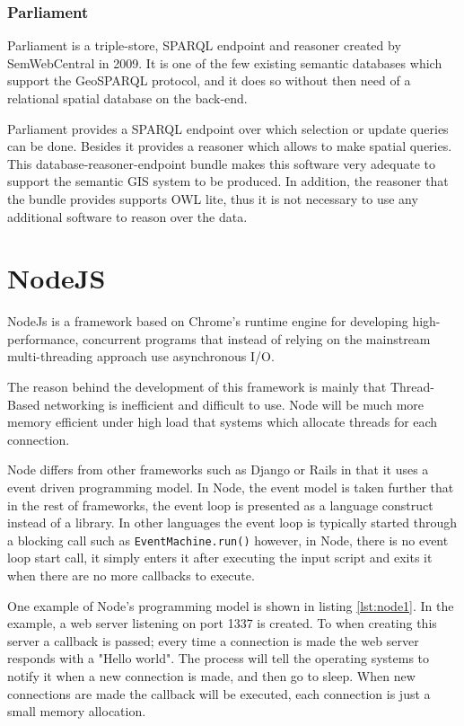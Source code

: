 \subsubsection*{Parliament}

Parliament\texttrademark\cite{parliament} is a triple-store, SPARQL endpoint and reasoner created by SemWebCentral in 2009. It is one of the few existing semantic databases which support the GeoSPARQL protocol, and it does so without then need of a relational spatial database on the back-end. 

Parliament provides a SPARQL endpoint over which selection or update queries can be done. Besides it provides a reasoner which allows to make spatial queries. This database-reasoner-endpoint bundle makes this software very adequate to support the semantic GIS system to be produced. In addition, the reasoner that the bundle provides supports OWL lite, thus it is not necessary to use any additional software to reason over the data. 

\section{NodeJS}

NodeJs is a framework based on Chrome's runtime engine\cite{v8} for developing high-performance, concurrent programs that instead of relying on the mainstream multi-threading approach use asynchronous I/O\cite{tilkov2010node}.

The reason behind the development of this framework is mainly that Thread-Based networking is inefficient and difficult to use. Node will be much more memory efficient under high load that systems which allocate threads for each connection.

Node differs from other frameworks such as Django or Rails in that it uses a event driven programming model. In Node, the event model is taken further that in the rest of frameworks, the event loop is presented as a language construct instead of a library. In other languages the event loop is typically started through a blocking call such as \texttt{EventMachine.run()} however, in Node, there is no event loop start call, it simply enters it after executing the input script and exits it when there are no more callbacks to execute.

One example of Node's programming model is shown in listing \ref{lst:node1}. In the example, a web server listening on port 1337 is created. To when creating this server a callback is passed; every time a connection is made the web server responds with a "Hello world". The process will tell the operating systems to notify it when a new connection is made, and then go to sleep. When new connections are made the callback will be executed, each connection is just a small memory allocation.

